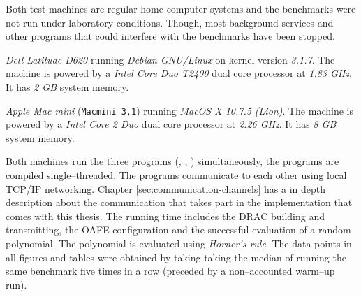 \label{sec:evaluation}

\label{sec:test-setup}

\label{sec:test-machines}

Both test machines are regular home computer systems and the benchmarks were not
run under laboratory conditions. Though, most background services and other
programs that could interfere with the benchmarks have been stopped.



\emph{Dell Latitude D620} running \emph{Debian GNU/Linux} on kernel version
\emph{3.1.7}. The machine is powered by a \emph{Intel\TReg{} Core Duo T2400}
dual core processor at \emph{1.83 GHz}. It has \emph{2 GB} system memory.



\emph{Apple Mac mini} (\texttt{Macmini 3,1}) running \emph{MacOS X 10.7.5
(Lion)}. The machine is powered by a \emph{Intel\TReg{} Core 2 Duo} dual core
processor at \emph{2.26 GHz}. It has \emph{8 GB} system memory.


Both machines run the three programs (\JWBpOne{}, \JWBpTwo{}, \JWBtoken{})
simultaneously, the programs are compiled single--threaded. The programs
communicate to each other using local TCP/IP networking. Chapter
\ref{sec:communication-channels} has a in depth description about the
communication that takes part in the implementation that comes with this thesis.
The running time includes the DRAC building and transmitting, the OAFE
configuration and the successful evaluation of a random polynomial. The
polynomial is evaluated using \emph{Horner's rule}\cite{cormen01}. The data
points in all figures and tables were obtained by taking taking the median of
running the same benchmark five times in a row (preceded by a non--accounted
warm--up run).


\label{sec:comp-complexity}

